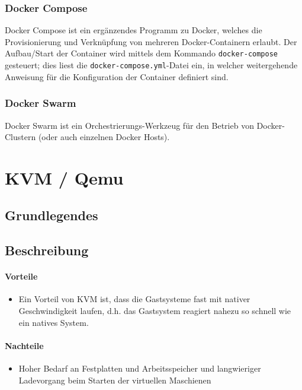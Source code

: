 \subsubsection{Docker Compose}

Docker Compose ist ein ergänzendes Programm zu Docker, welches die Provisionierung und Verknüpfung von mehreren Docker-Containern erlaubt. Der Aufbau/Start der Container wird mittels dem Kommando \lstinline|docker-compose| gesteuert; dies liest die \lstinline|docker-compose.yml|-Datei ein, in welcher weitergehende Anweisung für die Konfiguration der Container definiert sind.

\subsubsection{Docker Swarm}
Docker Swarm ist ein Orchestrierungs-Werkzeug für den Betrieb von Docker-Clustern (oder auch einzelnen Docker Hosts).


\section{KVM / Qemu}
\subsection{Grundlegendes}

\subsection{Beschreibung}
\paragraph{Vorteile}
\begin{itemize}
	\item Ein Vorteil von KVM ist, dass die Gastsysteme fast mit nativer Geschwindigkeit laufen, d.h. das Gastsystem reagiert nahezu so schnell wie ein natives System. 
\end{itemize}
\paragraph{Nachteile}
\begin{itemize}
	\item Hoher Bedarf an Festplatten und Arbeitsspeicher und langwieriger Ladevorgang beim Starten der virtuellen Maschienen
\end{itemize}

